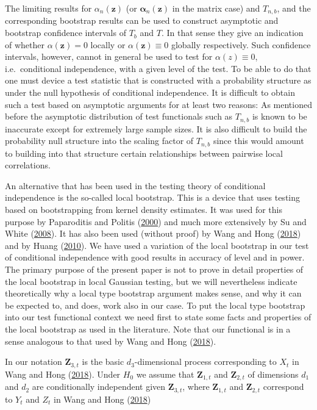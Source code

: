 \documentclass[
  12pt,
  letterpaper]{article}
\numberwithin{equation}{section}
\newcommand{\Z}{\bm{Z}}
\newcommand{\z}{\bm{z}}
\newcommand{\falpha}{\bm{\alpha}}
\begin{document}
The limiting results for \(\alpha_n(\z)\) (or \({\falpha_n}(\z)\) in the matrix case) and \(T_{n,b}\), and the corresponding bootstrap results can be used to construct asymptotic and bootstrap confidence intervals of \(T_b\) and \(T\). In that sense they give an indication of whether \(\alpha(\z) = 0\) locally or \(\alpha(\z) \equiv 0\) globally respectively. Such confidence intervals, however, cannot in general be used to test for \(\alpha(z) \equiv 0\), i.e.~conditional independence, with a given level of the test. To be able to do that one must device a test statistic that is constructed with a probability structure as under the null hypothesis of conditional independence. It is difficult to obtain such a test based on asymptotic arguments for at least two reasons: As mentioned before the asymptotic distribution of test functionals such as \(T_{n,b}\) is known to be inaccurate except for extremely large sample sizes. It is also difficult to build the probability null structure into the scaling factor of \(T_{n,b}\) since this would amount to building into that structure certain relationships between pairwise local correlations.

An alternative that has been used in the testing theory of conditional independence is the so-called local bootstrap. This is a device that uses testing based on bootstrapping from kernel density estimates. It was used for this purpose by Paparoditis and Politis (\protect\hyperlink{ref-paparoditis2000local}{2000}) and much more extensively by Su and White (\protect\hyperlink{ref-su2008nonparametric}{2008}). It has also been used (without proof) by Wang and Hong (\protect\hyperlink{ref-wang2017characteristic}{2018}) and by Huang (\protect\hyperlink{ref-huang2010testing}{2010}). We have used a variation of the local bootstrap in our test of conditional independence with good results in accuracy of level and in power. The primary purpose of the present paper is not to prove in detail properties of the local bootstrap in local Gaussian testing, but we will nevertheless indicate theoretically why a local type bootstrap argument makes sense, and why it can be expected to, and does, work also in our case. To put the local type bootstrap into our test functional context we need first to state some facts and properties of the local bootstrap as used in the literature. Note that our functional is in a sense analogous to that used by Wang and Hong (\protect\hyperlink{ref-wang2017characteristic}{2018}).

In our notation \(\Z_{3,t}\) is the basic \(d_3\)-dimensional process corresponding to \(X_t\) in Wang and Hong (\protect\hyperlink{ref-wang2017characteristic}{2018}). Under \(H_0\) we assume that \(\Z_{1,t}\) and \(\Z_{2,t}\) of dimensions \(d_1\) and \(d_2\) are conditionally independent given \(\Z_{3,t}\), where \(\Z_{1,t}\) and \(\Z_{2,t}\) correspond to \(Y_t\) and \(Z_t\) in Wang and Hong (\protect\hyperlink{ref-wang2017characteristic}{2018})
\end{document}
